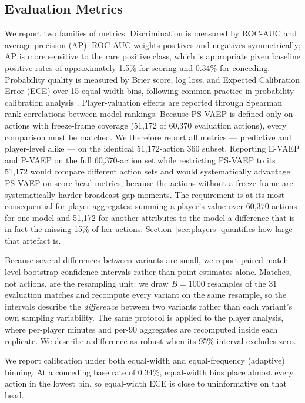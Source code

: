 \documentclass[runningheads]{llncs}
\begin{document}
\subsection{Evaluation Metrics}
We report two families of metrics. Discrimination is measured by ROC-AUC and average precision (AP). ROC-AUC weights positives and negatives symmetrically; AP is more sensitive to the rare positive class, which is appropriate given baseline positive rates of approximately 1.5\% for scoring and 0.34\% for conceding. Probability quality is measured by Brier score, log loss, and Expected Calibration Error (ECE) over 15 equal-width bins, following common practice in probability calibration analysis \cite{guo2017calibration}. Player-valuation effects are reported through Spearman rank correlations between model rankings.
Because PS-VAEP is defined only on actions with freeze-frame coverage (51{,}172 of 60{,}370 evaluation actions), every comparison must be matched. We therefore report all metrics --- predictive and player-level alike --- on the identical 51{,}172-action 360 subset. Reporting E-VAEP and P-VAEP on the full 60{,}370-action set while restricting PS-VAEP to its 51{,}172 would compare different action sets and would systematically advantage PS-VAEP on score-head metrics, because the actions without a freeze frame are systematically harder broadcast-gap moments. The requirement is at its most consequential for player aggregates: summing a player's value over 60{,}370 actions for one model and 51{,}172 for another attributes to the model a difference that is in fact the missing 15\% of her actions. Section~\ref{sec:players} quantifies how large that artefact is.

Because several differences between variants are small, we report paired match-level bootstrap confidence intervals rather than point estimates alone. Matches, not actions, are the resampling unit: we draw $B = 1000$ resamples of the 31 evaluation matches and recompute every variant on the same resample, so the intervals describe the \emph{difference} between two variants rather than each variant's own sampling variability. The same protocol is applied to the player analysis, where per-player minutes and per-90 aggregates are recomputed inside each replicate. We describe a difference as robust when its 95\% interval excludes zero.

We report calibration under both equal-width and equal-frequency (adaptive) binning. At a conceding base rate of $0.34\%$, equal-width bins place almost every action in the lowest bin, so equal-width ECE is close to uninformative on that head.
\end{document}
